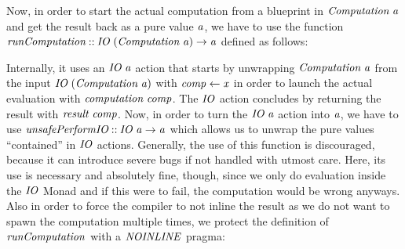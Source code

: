\documentclass[paper=A4,twoside=true,openright,parskip=full,chapterprefix=true,headings=normal,bibliography=totoc,listof=totoc,titlepage=on,captions=tableabove,draft=false,british]{scrreprt}%
\renewcommand{\enquote}[1]{{``}#1{''}}
\begin{document}
\resethooks
\vspace{-2\baselineskip}

Now, in order to start the actual computation from a blueprint in
\ensuremath{\Conid{Computation}\;\Varid{a}} and get the result back as a pure value \ensuremath{\Varid{a}}, we have to
use the function \ensuremath{\Varid{runComputation}\mathbin{::}\Conid{IO}\;(\Conid{Computation}\;\Varid{a})\to \Varid{a}} defined as
follows:

Internally, it uses an \ensuremath{\Conid{IO}\;\Varid{a}} action that starts by unwrapping
\ensuremath{\Conid{Computation}\;\Varid{a}} from the input \ensuremath{\Conid{IO}\;(\Conid{Computation}\;\Varid{a})} with \ensuremath{\Varid{comp}\leftarrow \Varid{x}} in
order to launch the actual evaluation with \ensuremath{\Varid{computation}\;\Varid{comp}}. The \ensuremath{\Conid{IO}}
action concludes by returning the result with \ensuremath{\Varid{result}\;\Varid{comp}}. Now, in
order to turn the \ensuremath{\Conid{IO}\;\Varid{a}} action into \ensuremath{\Varid{a}}, we have to use
\ensuremath{\Varid{unsafePerformIO}\mathbin{::}\Conid{IO}\;\Varid{a}\to \Varid{a}} which allows us to unwrap the pure values
\enquote{contained} in \ensuremath{\Conid{IO}} actions. Generally, the use of this function
is discouraged, because it can introduce severe bugs if not handled with
utmost care. Here, its use is necessary and absolutely fine, though,
since we only do evaluation inside the \ensuremath{\Conid{IO}} Monad and if this were to
fail, the computation would be wrong anyways. Also in order to force the
compiler to not inline the result as we do not want to spawn the
computation multiple times, we protect the definition of
\ensuremath{\Varid{runComputation}} with a \ensuremath{\Conid{NOINLINE}} pragma:
\end{document}
